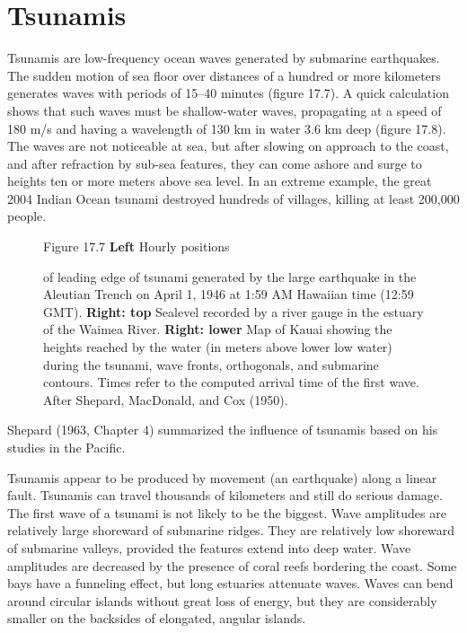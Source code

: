 \section{Tsunamis}
Tsunamis are low-frequency ocean waves generated by submarine earthquakes. The sudden motion of sea floor over distances of a hundred or more kilometers generates waves with periods of 15--40 minutes (figure 17.7). A quick calculation shows that such waves must be shallow-water waves, propagating at a speed of 180 m/s and having a wavelength of 130 km in water 3.6 km deep (figure 17.8). The waves are not noticeable at sea, but after slowing on approach to the coast, and
after refraction by sub-sea features, they can come ashore and surge to heights ten or more meters above sea level. In an extreme example, the great 2004 Indian Ocean tsunami destroyed hundreds of villages, killing at least  200,000 people.

\begin{figure}[t!]
\footnotesize Figure 17.7 \textbf{Left} Hourly positions \rule{0mm}{3ex}of leading
edge of tsunami generated by the large earthquake in the Aleutian
Trench on April 1, 1946 at 1:59 AM Hawaiian time (12:59 GMT).
\textbf{Right: top} Sealevel recorded by a river gauge in the estuary of the Waimea
River. 
\textbf{Right: lower} Map of Kauai showing the heights reached by the water (in meters above
lower low water) during the tsunami, wave fronts, orthogonals, and submarine contours. Times
refer to the computed arrival time of the first wave. After Shepard, MacDonald, and Cox (1950).
\label{fig:tsunami}
\vspace{-2ex}
\end{figure}

Shepard (1963, Chapter 4) summarized the influence of tsunamis
based on his studies in the Pacific.
\begin{enumerate}
\vitem
Tsunamis appear to be produced by movement (an earthquake) along a linear fault.
\vitem
Tsunamis can travel thousands of kilometers and still do serious damage.
\vitem
The first wave of a tsunami is not likely to be the biggest.
\vitem
Wave amplitudes are relatively large shoreward of submarine ridges. They are relatively low shoreward of submarine valleys, provided the features extend into deep water.
\vitem
Wave amplitudes are decreased by the presence of coral reefs bordering the coast.
\vitem
Some bays have a funneling effect, but long estuaries attenuate waves.
\vitem
Waves can bend around circular islands without great loss of energy, but they are considerably smaller on the backsides of elongated, angular islands.
\end{enumerate}

